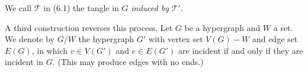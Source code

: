 We call $\mathscr{T}$ in (6.1) the tangle in $G$ \textit{induced by} $\mathscr{T}'$.

A third construction reverses this process. Let $G$ be a hypergraph and $W$ a set. We denote by $G/W$ the hypergraph $G'$ with vertex set $V(G) - W$ and edge set $E(G)$, in which $v \in V(G')$ and $e \in E(G')$ are incident if and only if they are incident in $G$. (This may produce edges with no ends.)
